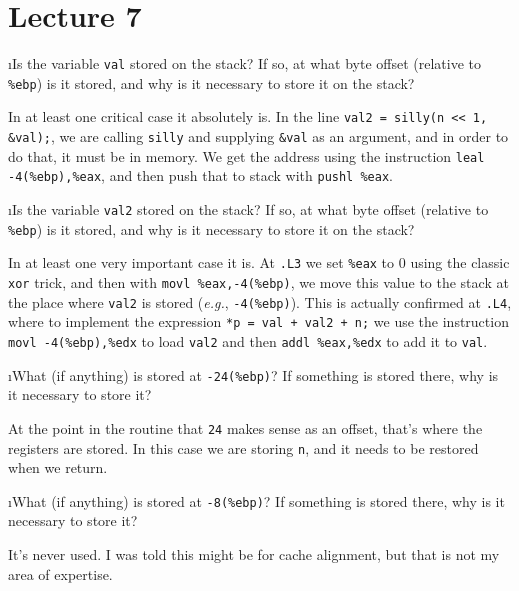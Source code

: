 \documentclass[fleqn]{article}
\begin{document}
\ene

\section{Lecture 7}

\bee
\i Is the variable \texttt{val} stored on the stack? If so, at what byte offset (relative to \texttt{\%ebp}) is it stored, and why is it necessary to store it on the stack?


\begin{solution}
In at least one critical case it absolutely is. In the line \texttt{val2 = silly(n << 1, \&val);}, we are calling \texttt{silly} and supplying \texttt{\&val} as an argument, and in order to do that, it must be in memory. We get the address using the instruction \texttt{leal -4(\%ebp),\%eax}, and then push that to stack with \texttt{pushl \%eax}.
\end{solution}

\i Is the variable \texttt{val2} stored on the stack? If so, at what byte offset (relative to \texttt{\%ebp}) is it stored, and why is it necessary to store it on the stack?

\begin{solution}
In at least one very important case it is. At \texttt{.L3} we set \texttt{\%eax} to 0 using the classic \texttt{xor} trick, and then with \texttt{movl \%eax,-4(\%ebp)}, we move this value to the stack at the place where \texttt{val2} is stored (\textit{e.g.}, \texttt{-4(\%ebp)}). This is actually confirmed at \texttt{.L4}, where to implement the expression \texttt{*p = val + val2 + n;} we use the instruction \texttt{movl -4(\%ebp),\%edx} to load \texttt{val2} and then \texttt{addl \%eax,\%edx} to add it to \texttt{val}.
\end{solution}

\i What (if anything) is stored at \texttt{-24(\%ebp)}? If something is stored there, why is it necessary to store it?

\begin{solution}
At the point in the routine that \texttt{24} makes sense as an offset, that's where the registers are stored. In this case we are storing \texttt{n}, and it needs to be restored when we return.
\end{solution}

\i What (if anything) is stored at \texttt{-8(\%ebp)}? If something is stored there, why is it necessary to store it?

\begin{solution}
It's never used. I was told this might be for cache alignment, but that is not my area of expertise.
\end{solution}

\ene
\end{document}
